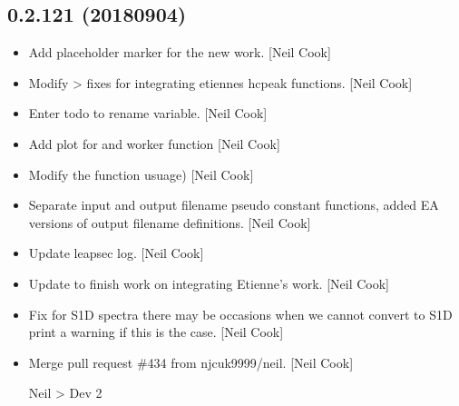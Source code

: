 \documentclass[a4paper,10pt,english]{report}
\begin{document}
\subsection{0.2.121 (2018\sphinxhyphen{}09\sphinxhyphen{}04)}
\label{\detokenize{misc/changelog:id360}}\begin{itemize}
\item {} 
Add placeholder marker for the new  work. {[}Neil
Cook{]}

\item {} 
Modify  \textendash{}\textgreater{} fixes for integrating etiennes
hcpeak functions. {[}Neil Cook{]}

\item {} 
Enter todo to rename variable. {[}Neil Cook{]}

\item {} 
Add plot for   and
worker function  {[}Neil Cook{]}

\item {} 
Modify the  function  usuage) {[}Neil Cook{]}

\item {} 
Separate input and output filename pseudo constant functions, added EA
versions of  output filename definitions. {[}Neil Cook{]}

\item {} 
Update leapsec log. {[}Neil Cook{]}

\item {} 
Update to  \sphinxhyphen{} finish work on integrating Etienne’s
work. {[}Neil Cook{]}

\item {} 
Fix for S1D spectra \sphinxhyphen{} there may be occasions when we cannot convert to
S1D \sphinxhyphen{} print a warning if this is the case. {[}Neil Cook{]}

\item {} 
Merge pull request \#434 from njcuk9999/neil. {[}Neil Cook{]}

Neil \textendash{}\textgreater{} Dev 2

\end{itemize}
\end{document}
